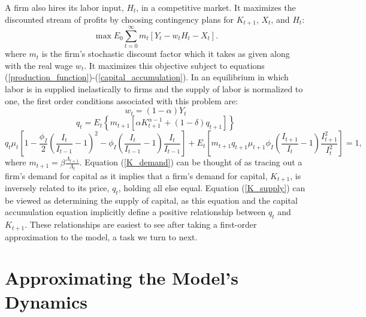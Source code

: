 \documentclass[11pt,fleqn]{article}
\begin{document}
A firm also hires its labor input, $H_t$, in a competitive market.  It maximizes the discounted stream of profits by choosing contingency plans for $K_{t+1}$, $X_t$, and $H_t$:
\begin{equation}
\max E_0 \sum^{\infty}_{t=0} m_t  \left[Y_t - w_t H_t - X_t  \right].
\end{equation}
where $m_t$ is the firm's stochastic discount factor which it takes as given along with the real wage $w_t$. It maximizes this objective subject to equations (\ref{production_function})-(\ref{capital_accumulation}).  In an equilibrium in which labor is in supplied inelastically to firms and the supply of labor is normalized to one, the first order conditions associated with this problem are:
\begin{equation}
w_t = (1-\alpha) Y_t
\end{equation}
\begin{equation}
q_t = E_t \left\{ m_{t+1} \left[ \alpha K^{\alpha-1}_{t+1} + (1-\delta) q_{t+1} \right]  \right\} \label{K_demand}
\end{equation}
\begin{equation}
q_t \mu_t \left[ 1 - \frac{\phi_I}{2}\left(\frac{I_t}{I_{t-1}}-1\right)^2 - \phi_I \left(\frac{I_t}{I_{t-1}}-1\right) \frac{I_t}{I_{t-1}} \right]
+ E_t \left[ m_{t+1} q_{t+1} \mu_{t+1} \phi_I \left(\frac{I_{t+1}}{I_{t}}-1\right) \frac{I^2_{t+1}}{I^2_{t}} \right] =1,  \label{K_supply}
\end{equation}
where $m_{t+1} = \beta \frac{\Lambda_{t+1}}{\Lambda_t}$.  Equation (\ref{K_demand}) can be thought of as tracing out a firm's demand for capital as it implies that a firm's demand for capital, $K_{t+1}$, is inversely related to its price, $q_t$, holding all else equal.  Equation (\ref{K_supply}) can be viewed as determining the supply of capital, as this equation and the capital accumulation equation implicitly define a positive relationship between $q_t$ and $K_{t+1}$.  These relationships are easiest to see after taking a first-order approximation to the model, a task we turn to next.

\section{Approximating the Model's Dynamics}
\end{document}
